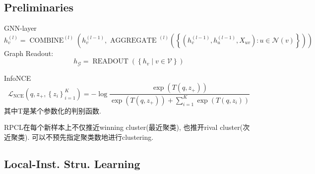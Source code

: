 \documentclass{article}
\begin{document}
\subsection{Preliminaries}

 GNN-layer
\begin{equation}
    h_{v}^{(l)}=\operatorname{COMBINE}^{(l)}\left(h_{v}^{(l-1)}, \text { AGGREGATE }^{(l)}\left(\left\{\left(h_{v}^{(l-1)}, h_{u}^{(l-1)}, X_{u v}\right): u \in \mathcal{N}(v)\right\}\right)\right)
\end{equation}
Graph Readout: 
\begin{equation}
    h_{\mathcal{G}}=\operatorname{READOUT}\left(\left\{h_{v} \mid v \in \mathcal{V}\right\}\right)
\end{equation}

 InfoNCE
\begin{equation}
    \mathcal{L}_{\mathrm{NCE}}\left(q, z_{+},\left\{z_{i}\right\}_{i=1}^{K}\right)=-\log \frac{\exp \left(T\left(q, z_{+}\right)\right)}{\exp \left(T\left(q, z_{+}\right)\right)+\sum_{i=1}^{K} \exp \left(T\left(q, z_{i}\right)\right)}
\end{equation}
其中T是某个参数化的判别函数.

RPCL在每个新样本上不仅推近winning cluster(最近聚类), 也推开rival cluster(次近聚类). 可以不预先指定聚类数地进行clustering.

\subsection{Local-Inst. Stru. Learning}
\end{document}
